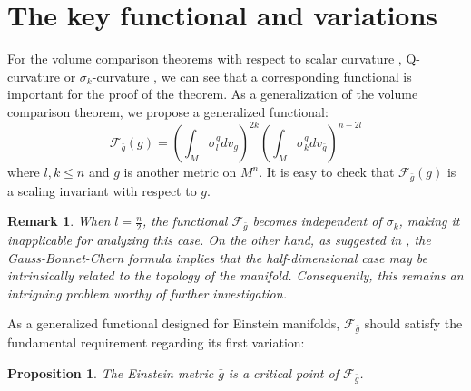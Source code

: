\documentclass[12pt]{amsart}
\newtheorem{proposition}{Proposition}[section]
\newtheorem{remark}{Remark}[section]
\newcommand{\bg}{\bar{g}}
\numberwithin{equation}{section}
\begin{document}
\section{The key functional and variations}\label{Section: 3}
For the volume comparison theorems with respect to scalar curvature \cite{Yuan_VolumeCW}, Q-curvature \cite{Yuan_Q2} or $\sigma_k$-curvature \cite{2025Volume}, we can see that a corresponding functional is important for the proof of the theorem. As a generalization of the volume comparison theorem, we propose a generalized functional:
\begin{equation*}
    \mathcal{F}_{\bg}(g)=\left(\int_M\sigma_l^gdv_g\right)^{2k}\left(\int_M\sigma_k^gdv_{\bg}\right)^{n-2l}
\end{equation*}
where $l,k\leq n$ and $g$ is another metric on $M^n$. It is easy to check that $\mathcal{F}_{\bg}(g)$ is a scaling invariant with respect to $g$. 

\begin{remark}
    When $l=\frac{n}{2}$, the functional $\mathcal{F}_{\bg}$ becomes independent of  $\sigma_k$, making it inapplicable for analyzing this case. On the other hand, as suggested in \cite{Chern}, the Gauss-Bonnet-Chern formula implies that the half-dimensional case may be intrinsically related to the topology of the manifold. Consequently, this remains an intriguing problem worthy of further investigation.
\end{remark}

As a generalized functional designed for Einstein manifolds, $\mathcal{F}_{\bg}$ should satisfy the fundamental requirement regarding its first variation:


\begin{proposition}\label{Proposition: critical_pts}
The Einstein metric $\bg$ is a critical point of  $\mathcal{F}_{\bg}$.
\end{proposition}
\end{document}
